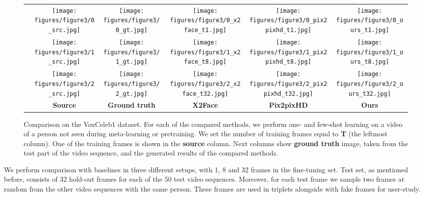 \documentclass[10pt,twocolumn,letterpaper]{article}
\begin{document}
\begin{figure*}
    \centering    
    \setlength{\wid}{0.179\textwidth}
    \addtolength{\tabcolsep}{-4pt}
    \begin{tabular}{m{0.6cm}c:cccc}
        &
        \texttt{[image: figures/figure3/0\_src.jpg]}
        \;&\;
        \texttt{[image: figures/figure3/0\_gt.jpg]}&
        \texttt{[image: figures/figure3/0\_x2face\_t1.jpg]}&
        \texttt{[image: figures/figure3/0\_pix2pixhd\_t1.jpg]}&
        \texttt{[image: figures/figure3/0\_ours\_t1.jpg]}\\
        &
        \texttt{[image: figures/figure3/1\_src.jpg]}
        \;&\;
        \texttt{[image: figures/figure3/1\_gt.jpg]}&
        \texttt{[image: figures/figure3/1\_x2face\_t8.jpg]}&
        \texttt{[image: figures/figure3/1\_pix2pixhd\_t8.jpg]}&
        \texttt{[image: figures/figure3/1\_ours\_t8.jpg]}\\
        &
        \texttt{[image: figures/figure3/2\_src.jpg]}
        \;&\;
        \texttt{[image: figures/figure3/2\_gt.jpg]}&
        \texttt{[image: figures/figure3/2\_x2face\_t32.jpg]}&
        \texttt{[image: figures/figure3/2\_pix2pixhd\_t32.jpg]}&
        \texttt{[image: figures/figure3/2\_ours\_t32.jpg]}\\
         & \textbf{Source} \;&\; \textbf{Ground truth} & \textbf{X2Face} & \textbf{Pix2pixHD} & \textbf{Ours}
    \end{tabular}\vspace{-2pt}
    \caption{Comparison on the VoxCeleb1 dataset. For each of the compared methods, we perform one- and few-shot learning on a video of a person not seen during meta-learning or pretraining. We set the number of training frames equal to \textbf{T} (the leftmost column). One of the training frames is shown in the \textbf{source} column. Next columns show \textbf{ground truth} image, taken from the test part of the video sequence, and the generated results of the compared methods.\vspace{-4pt}}
    \label{fig:voxceleb1}
\end{figure*}

We perform comparison with baselines in three different setups, with 1, 8 and 32 frames in the fine-tuning set. Test set, as mentioned before, consists of 32 hold-out frames for each of the 50 test video sequences. Moreover, for each test frame we sample two frames at random from the other video sequences with the same person. These frames are used in triplets alongside with fake frames for user-study.
\end{document}
